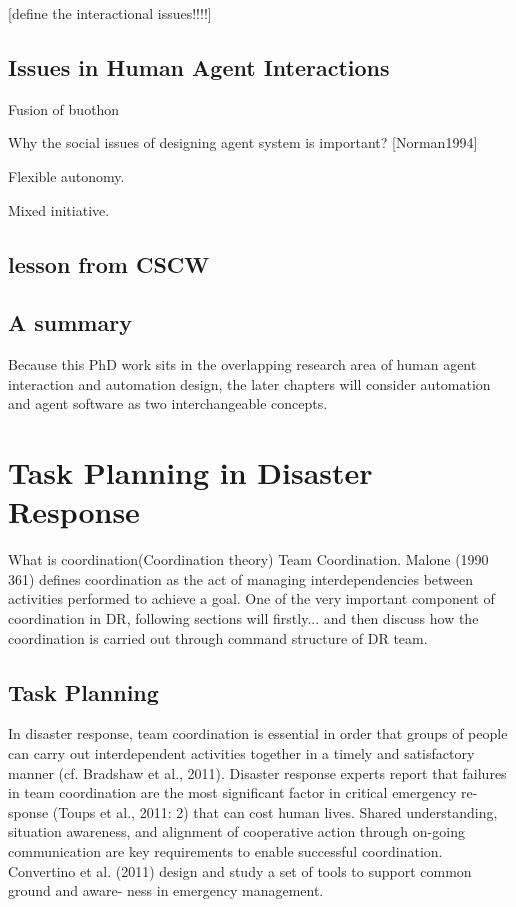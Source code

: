 [define the interactional issues!!!!]




\subsection{ Issues in Human Agent Interactions }
Fusion of buothon 





Why the social issues of designing agent system is important? [Norman1994]

Flexible autonomy.

Mixed initiative.

\subsection{lesson from CSCW}

\subsection{A summary}

Because this PhD work sits in the overlapping research area of human agent interaction and automation design, the later chapters will consider automation and agent software as two interchangeable concepts.


\section{Task Planning in Disaster Response}\label{ch:teams}

What is coordination(Coordination theory) Team Coordination. Malone (1990 361) defines coordination as the act of managing interdependencies between activities performed to achieve a goal. One of the very important component of coordination in DR, following sections will firstly... and then discuss how the coordination is carried out through command structure of DR team. 

\subsection{Task Planning}
In disaster response, team coordination is essential in order that groups of people can carry out interdependent activities together in a timely and satisfactory manner (cf. Bradshaw et al., 2011). Disaster response experts report that failures in team coordination are the most significant factor in critical emergency re- sponse (Toups et al., 2011: 2) that can cost human lives. Shared understanding, situation awareness, and alignment of cooperative action through on-going communication are key requirements to enable successful coordination. Convertino et al. (2011) design and study a set of tools to support common ground and aware- ness in emergency management. \\

